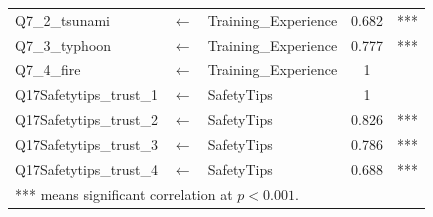 \begin{table}[h]
\begin{tabular}{lcl|c|c}
Q7\_2\_tsunami          &$\longleftarrow$ & Training\_Experience & 0.682  & ***                  \\
Q7\_3\_typhoon          &$\longleftarrow$ & Training\_Experience & 0.777  & ***                  \\
Q7\_4\_fire             &$\longleftarrow$ & Training\_Experience & 1      & \\
Q17Safetytips\_trust\_1 &$\longleftarrow$ & SafetyTips           & 1      &  \\
Q17Safetytips\_trust\_2 &$\longleftarrow$ & SafetyTips           & 0.826  & ***                  \\
Q17Safetytips\_trust\_3 &$\longleftarrow$ & SafetyTips           & 0.786  & ***                  \\
Q17Safetytips\_trust\_4 &$\longleftarrow$ & SafetyTips           & 0.688  & ***                 \\
 \hline
\multicolumn{5}{l}{*** means significant correlation at $p<0.001$.}
  \end{tabular}
\end{table}

